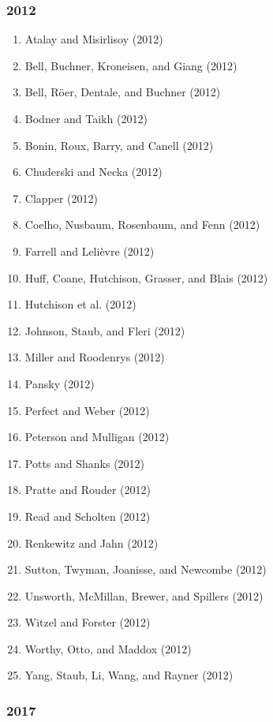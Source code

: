 \documentclass[english,man]{apa6}
\providecommand{\tightlist}{%
  \setlength{\itemsep}{0pt}\setlength{\parskip}{0pt}}
\begin{document}
\subsubsection{2012}\label{section-6}

\begin{enumerate}
\def\labelenumi{\arabic{enumi})}
\tightlist
\item
  Atalay and Misirlisoy (2012)
\item
  Bell, Buchner, Kroneisen, and Giang (2012)
\item
  Bell, Röer, Dentale, and Buchner (2012)
\item
  Bodner and Taikh (2012)
\item
  Bonin, Roux, Barry, and Canell (2012)
\item
  Chuderski and Necka (2012)
\item
  Clapper (2012)
\item
  Coelho, Nusbaum, Rosenbaum, and Fenn (2012)
\item
  Farrell and Lelièvre (2012)
\item
  Huff, Coane, Hutchison, Grasser, and Blais (2012)
\item
  Hutchison et al. (2012)
\item
  Johnson, Staub, and Fleri (2012)
\item
  Miller and Roodenrys (2012)
\item
  Pansky (2012)
\item
  Perfect and Weber (2012)
\item
  Peterson and Mulligan (2012)
\item
  Potts and Shanks (2012)
\item
  Pratte and Rouder (2012)
\item
  Read and Scholten (2012)
\item
  Renkewitz and Jahn (2012)
\item
  Sutton, Twyman, Joanisse, and Newcombe (2012)
\item
  Unsworth, McMillan, Brewer, and Spillers (2012)
\item
  Witzel and Forster (2012)
\item
  Worthy, Otto, and Maddox (2012)
\item
  Yang, Staub, Li, Wang, and Rayner (2012)
\end{enumerate}

\subsubsection{2017}\label{section-7}
\end{document}
